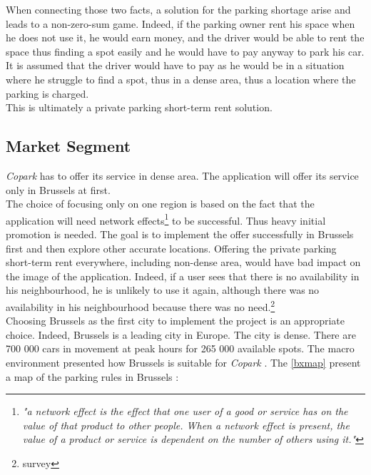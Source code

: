 \documentclass[12pt,a4paper,oneside]{book}
\newcommand{\bp}{\textit{Copark }}
\begin{document}
When connecting those two facts, a solution for the parking shortage arise and leads to a non-zero-sum game. Indeed, if the parking owner rent his space when he does not use it, he would earn money, and the driver would be able to rent the space thus finding a spot easily and he would have to pay anyway to park his car. It is assumed that the driver would have to pay as he would be in a situation where he struggle to find a spot, thus in a dense area, thus a location where the parking is charged.\\

This is ultimately a private parking short-term rent solution.

\subsection{Market Segment}
\bp has to offer its service in dense area. The application will offer its service only in Brussels at first.\\

The choice of focusing only on one region is based on the fact that the application will need network effects\footnote{\textit{"a network effect is the effect that one user of a good or service has on the value of that product to other people. When a network effect is present, the value of a product or service is dependent on the number of others using it."}\cite{shapiro2013information}} to be successful. Thus heavy initial promotion is needed. The goal is to implement the offer successfully in Brussels first and then explore other accurate locations. Offering the private parking short-term rent everywhere, including non-dense area, would have bad impact on the image of the application. Indeed, if a user sees that there is no availability in his neighbourhood, he is unlikely to use it again, although there was no availability in his neighbourhood because there was no need.\footnote{survey} \\

Choosing Brussels as the first city to implement the project is an appropriate choice. Indeed, Brussels is a leading city in Europe. The city is dense. There are 700 000 cars in movement at peak hours for 265 000 available spots.\cite{parkbx} The macro environment presented how Brussels is suitable for \bp. The \autoref{bxmap} present a map of the parking rules in Brussels\cite{parkbx} : \\
\end{document}
